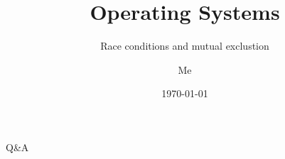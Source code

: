 \documentclass[12pt]{beamer}
\title{Operating Systems}
\subtitle{Race conditions and mutual exclustion}
\author{Me}
\date{\today}
\begin{document}
  \begin{frame}
    \titlepage
  \end{frame}

  
  

  \begin{frame}
  \begin{center}
  \Huge Q\&A
  \end{center}
  \end{frame}
\end{document}
